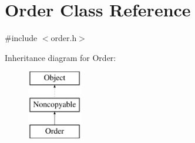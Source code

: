 \hypertarget{classOrder}{}\section{Order Class Reference}
\label{classOrder}


{\ttfamily \#include $<$order.\+h$>$}

Inheritance diagram for Order\+:\begin{figure}[H]
\begin{center}
\leavevmode
\includegraphics[height=3.000000cm]{classOrder}
\end{center}
\end{figure}
